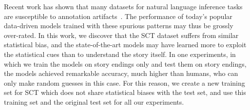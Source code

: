 Recent work has shown that many datasets for natural language inference tasks
are susceptible to annotation artifacts~\cite{gururangan2018annotation}. 
The performance of today's popular 
data-driven models trained with these spurious patterns 
may thus be grossly over-rated. In this work, we discover that the
SCT dataset suffers from similar statistical bias, and the state-of-the-art models 
may have learned more to exploit the statistical cues than to understand
the story itself. In one experiments, in which we train the models on story endings only 
and test them on story endings, the models achieved remarkable accuracy, 
much higher than humans, who can only make random guesses in this case. 
For this reason, we create a new training set for SCT which does not share statistical biases
with the test set, and use this training set and the original test set for all our experiments.


